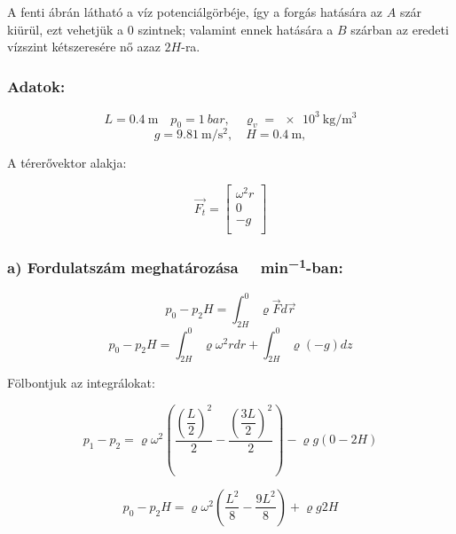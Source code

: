 \vspace{5mm}

A fenti ábrán látható a víz potenciálgörbéje, így a forgás hatására az $A$ szár kiürül, ezt vehetjük a $0$ szintnek; valamint ennek hatására a $B$ szárban az eredeti vízszint kétszeresére nő azaz $2H$-ra.

\subsubsection* {Adatok:}

\begin{equation}
L = \SI{0,4}{\meter}
\quad
p_0 = \SI{1}{bar},
\quad
\varrho_v = \SI{e3}{\kilogram\per\meter\cubed}
\end{equation}
\begin{equation}
g = \SI{9,81}{\meter\per\second\squared},
\quad
H = \SI{0,4}{\meter},
\end{equation}

\vspace{20mm}
A térerővektor alakja:

\[
\vec{F_t}=
\left[ {\begin{array}{ccc}
	\omega^2 r \\
	0 \\
	-g \\
	\end{array} } \right]
\]
	
\subsubsection* {a) Fordulatszám meghatározása \SI{}{\1\per\minute}-ban:}


\begin{equation}
p_0 - p_2H = \int_{2H}^{0} \varrho\vec{F} d\vec{r}
\end{equation}
\begin{equation}
p_0 - p_2H = \int_{2H}^{0} \varrho\omega^2 r dr + \int_{2H}^{0} \varrho\left(-g\right) dz
	\end{equation}

Fölbontjuk az integrálokat:

\begin{equation}
p_1 - p_2 = \varrho\omega^2 \left(\dfrac{\left(\dfrac{L}{2}\right)^2}{2} - \dfrac{\left(\dfrac{3L}{2}\right)^2}{2}\right) - \varrho g\left(0 - 2H\right)
\end{equation}

\begin{equation}
p_0 - p_2H = \varrho\omega^2 \left(\dfrac{L^2}{8} - \dfrac{9L^2}{8}\right) + \varrho g 2H
\end{equation}

